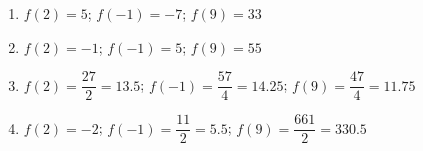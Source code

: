 \documentclass[a4paper,11pt]{article}
\begin{document}
\begin{solution}
\begin{enumerate}
\item $f(2)=5$; $f(-1)=-7$; $f(9)=33$
\item $f(2)=-1$; $f(-1)=5$; $f(9)=55$
\item $f(2)=\dfrac{27}{2}=13.5$; $f(-1)=\dfrac{57}{4}=14.25$; $f(9)=\dfrac{47}{4}=11.75$
\item $f(2)=-2$; $f(-1)=\dfrac{11}{2}=5.5$; $f(9)=\dfrac{661}{2}=330.5$
\end{enumerate}
\end{solution}
\end{document}
